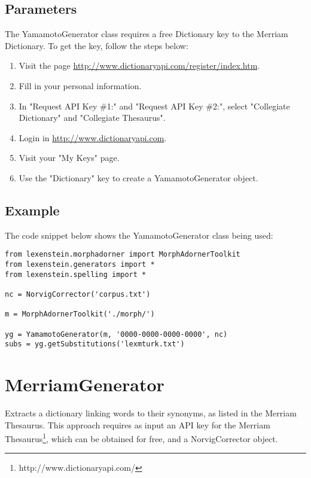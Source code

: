\subsection{Parameters}

The YamamotoGenerator class requires a free Dictionary key to the Merriam Dictionary. To get the key, follow the steps below:

\begin{enumerate}
\item Visit the page \url{http://www.dictionaryapi.com/register/index.htm}.
\item Fill in your personal information.
\item In "Request API Key \#1:" and "Request API Key \#2:", select "Collegiate Dictionary" and "Collegiate Thesaurus".
\item Login in \url{http://www.dictionaryapi.com}.
\item Visit your "My Keys" page.
\item Use the "Dictionary" key to create a YamamotoGenerator object.
\end{enumerate}

\subsection{Example}

The code snippet below shows the YamamotoGenerator class being used:

\begin{lstlisting}
from lexenstein.morphadorner import MorphAdornerToolkit
from lexenstein.generators import *
from lexenstein.spelling import *

nc = NorvigCorrector('corpus.txt')

m = MorphAdornerToolkit('./morph/')

yg = YamamotoGenerator(m, '0000-0000-0000-0000', nc)
subs = yg.getSubstitutions('lexmturk.txt')
\end{lstlisting}













\section{MerriamGenerator}

Extracts a dictionary linking words to their synonyms, as listed in the Merriam Thesaurus. This approach requires as input an API key for the Merriam Thesaurus\footnote{http://www.dictionaryapi.com/}, which can be obtained for free, and a NorvigCorrector object.


